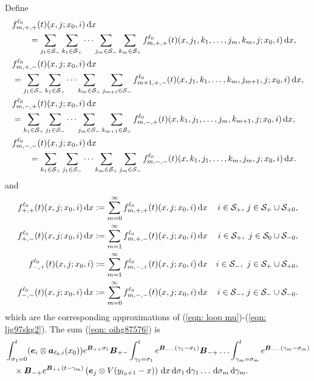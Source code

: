 Define
\begin{align}
	&f_{m,+,+}^{\ell_0}(t)(x,j;x_0,i) \, \mathrm{d} x \nonumber 
	\\&\qquad= \sum_{j_1\in\mathcal S_-} \sum_{k_1\in\mathcal S_+}\dots \sum_{j_m\in\mathcal S_-}\sum_{k_m\in\mathcal S_+} f_{m,+,+}^{\ell_0}(t)(x, j_1,k_1,\dots,j_m,k_m, j; x_0,i) \, \mathrm{d} x,\label{eqn: oihg87576}
	\\&f^{\ell_0}_{m,+,-}(t)(x, j; x_0,i) \, \mathrm{d} x \nonumber
	\\&= \sum_{j_1\in\mathcal S_-} \sum_{k_1\in\mathcal S_+}\dots \sum_{k_m\in\mathcal S_+}\sum_{j_{m+1}\in\mathcal S_-}f^{\ell_0}_{m+1,+,-}(t)(x, j_1,k_1,\dots,k_m,j_{m+1}, j; x_0,i) \, \mathrm{d} x,
	\\&f^{\ell_0}_{m,-,+}(t)(x, j; x_0,i) \, \mathrm{d} x \nonumber
	\\&= \sum_{k_1\in\mathcal S_+} \sum_{j_1\in\mathcal S_-}\dots \sum_{j_m\in\mathcal S_-}\sum_{k_{m+1}\in\mathcal S_+}f^{\ell_0}_{m,-,+}(t)(x, k_1,j_1,\dots,j_m,k_{m+1}, j; x_0,i)  \, \mathrm{d} x,
	\\&f^{\ell_0}_{m,-,-}(t)(x, j; x_0,i) \, \mathrm{d} x \nonumber 
	\\&\qquad = \sum_{k_1\in\mathcal S_+} \sum_{j_1\in\mathcal S_-}\dots \sum_{k_m\in\mathcal S_+}\sum_{j_m\in\mathcal S_-}f^{\ell_0}_{m,-,-}(t)(x, k_1, j_1,\dots,k_m,j_m, j; x_0,i) \, \mathrm{d} x.  \label{eqn: many eqns}
\end{align}
and
\begin{align*}
		f^{\ell_0}_{+,+}(t)(x,j;x_0,i)\, \mathrm{d} x &:= \sum_{m=0}^\infty f^{\ell_0}_{m,+,+}(t)(x,j;x_0,i)\, \mathrm{d} x & i\in\mathcal{S}_+,\,j\in\mathcal{S}_+\cup\mathcal{S}_{+0},
		\\ f^{\ell_0}_{+,-}(t)(x,j;x_0,i)\, \mathrm{d} x &:= \sum_{m=1}^\infty f^{\ell_0}_{m,+,-}(t)(x,j;x_0,i)\, \mathrm{d} x & i\in\mathcal S_+,\,\,j\in\mathcal S_{0}\cup\mathcal{S}_{-0},
		\\ f^{\ell_0}_{-,+}(t)(x,j;x_0,i) &:= \sum_{m=1}^\infty f^{\ell_0}_{m,-,+}(t)(x,j;x_0,i)\, \mathrm{d} x & i\in\mathcal S_-,\,\,j\in\mathcal S_{+}\cup\mathcal{S}_{+0},
		\\ f^{\ell_0}_{-,-}(t)(x,j;x_0,i)\, \mathrm{d} x &:= \sum_{m=0}^\infty f^{\ell_0}_{m,-,-}(t)(x,j;x_0,i)\, \mathrm{d} x & i\in\mathcal{S}_-,\,j\in\mathcal S_-\cup\mathcal{S}_{-0}.
\end{align*}
which are the corresponding approximations of (\ref{eqn: loop mu})-(\ref{eqn: ljg97skg2}).
The sum (\ref{eqn: oihg87576}) is 
\begin{align}
	&\int_{\sigma_1=0}^t (\boldsymbol e_i\otimes \boldsymbol  a_{\ell_0,i}(x_0)) e^{\boldsymbol{B}_{++}\sigma_1}\boldsymbol{B}_{+-}	\nonumber
	\int_{\gamma_1=\sigma_1}^{t} e^{\boldsymbol{B}_{--}(\gamma_1-\sigma_1)}\boldsymbol{B}_{-+}
	\hdots 
	 \int_{\gamma_m=\sigma_{m}}^{t} e^{\boldsymbol{B}_{--}(\gamma_m-\sigma_{m})}\\&\quad\times\boldsymbol{B}_{-+}
	e^{\boldsymbol{B}_{++}(t-\gamma_m)}\left(\boldsymbol e_j \otimes V(y_{\ell_0+1}-x)\right)\, \mathrm{d} x
	\, \mathrm{d} \sigma_1\, \mathrm{d} \gamma_1\dots \, \mathrm{d} \sigma_m\, \mathrm{d} \gamma_m. \label{eqn: looper}
\end{align}
